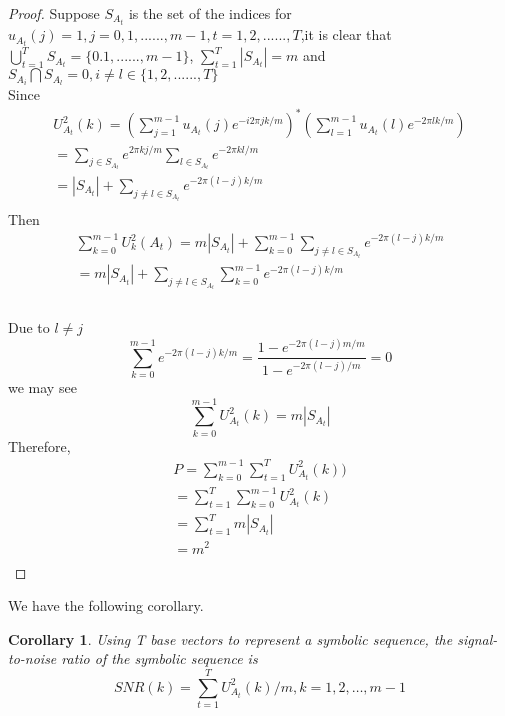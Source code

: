\documentclass[preprint,authoryear,12pt]{elsarticle}
\newtheorem{cor}[thm]{Corollary}
\begin{document}
\begin{proof}
Suppose $S_{A_t } $  is the set of the indices for $u_{A_t}(j ) = 1,j = 0,1,......,m - 1,t = 1,2,......,T$,it is clear that $\bigcup\limits_{t = 1}^T {S_{A_t } }  = \{ 0.1,......,m - 1\} $, $\sum\limits_{t = 1}^T {\left| {S_{A_t } } \right|}  = m$ and $S_{A_i } \bigcap {S_{A_l } }  = 0,i \ne l \in \{ 1,2,......,T\} $\\
Since
$$
\begin{array}{l}
 U_{A_t} ^2 (k) = (\sum\limits_{j = 1}^{m - 1} {u_{A_t}(j)} e^{ - i2\pi jk/m} )^* (\sum\limits_{l = 1}^{m - 1} {u_{A_t}(l)e^{ - 2\pi lk/m} } ) \\
  = \sum\limits_{j\in S_{A_t } } {e^{2\pi kj/m} } \sum\limits_{l \in S_{A_t } } {e^{ - 2\pi kl/m} }  \\
  = \left| {S_{A_t } } \right| + \sum\limits_{j \ne l \in S_{A_t } } {e^{ - 2\pi (l - j)k/m} }  \\
 \end{array}
$$
Then
$$\begin{array}{l}
 \sum\limits_{k = 0}^{m - 1} {U_k ^2 (A_t )}  = m\left| {S_{A_t } } \right| + \sum\limits_{k = 0}^{m - 1} {\sum\limits_{j \ne l \in S_{A_t } } {e^{ - 2\pi (l - j)k/m} } }  \\
  = m\left| {S_{A_t } } \right| + \sum\limits_{j \ne l \in S_{A_t } } {\sum\limits_{k = 0}^{m - 1} {e^{ - 2\pi (l - j)k/m} } }  \\
 \end{array}$$
\\
Due to ${l}\neq{j}$
$$
\sum\limits_{k = 0}^{m - 1} {e^{ - 2\pi (l - j)k/m} }  = \frac{{1 - e^{ - 2\pi (l - j)m/m} }}{{1 - e^{ - 2\pi (l - j)/m} }} = 0
$$
we may see\\
$$
\sum\limits_{k = 0}^{m - 1} {U_{A_t} ^2 (k)}  = m\left| {S_{A_t } } \right|
$$
 Therefore,\\
 $$
 \begin{array}{l}
 P = \sum\limits_{k = 0}^{m - 1} {\sum\limits_{t = 1}^T {U_{A_t}^2 (k)} } ) \\
  = \sum\limits_{t = 1}^T {\sum\limits_{k = 0}^{m - 1} {U_{A_t} ^2 } } (k) \\
  = \sum\limits_{t = 1}^T {m\left| {S_{A_t}}\right|}  \\
  = m^2  \\
 \end{array}
 $$
\end{proof}
We have the following corollary.\\
\begin{cor}\label{3.1}
Using T base vectors to represent a symbolic sequence, the signal-to-noise ratio of the symbolic sequence is
$$
SNR(k) = \sum\limits_{t = 1}^T {U_{A_t} ^2 (k)} /m,k = 1,2, \ldots ,m - 1
$$
\end{cor}
\end{document}

